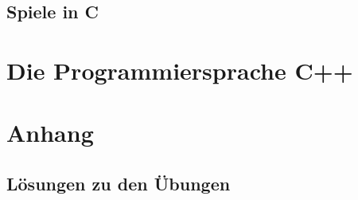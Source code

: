 \chapter{Spiele in C}
\label{sec:c-spiele}

% 

\part{Die Programmiersprache C++}

\appendix
\part{Anhang}




\newpage\chapter{Lösungen zu den Übungen}
\printsolutions

\backmatter




\printbibliography

\printindex


